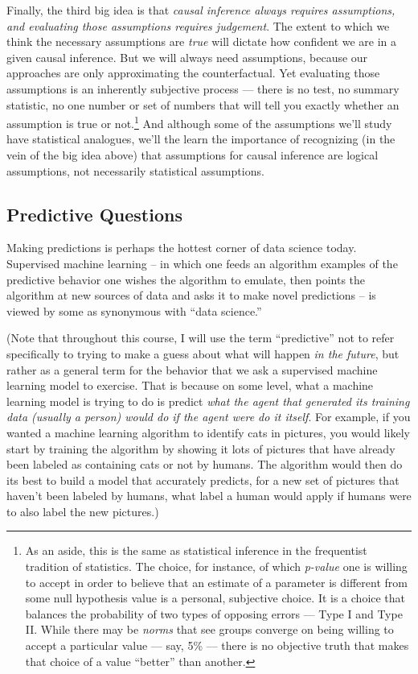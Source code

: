 \documentclass[12pt]{article}
\begin{document}
Finally, the third big idea is that \emph{causal inference always requires assumptions, and evaluating those assumptions requires judgement}.  The extent to which we think the necessary assumptions are \emph{true} will dictate how confident we are in a given causal inference.  But we will always need assumptions, because our approaches are only approximating the counterfactual.  Yet evaluating those assumptions is an inherently subjective process --- there is no test, no summary statistic, no one number or set of numbers that will tell you exactly whether an assumption is true or not.\footnote{\rmfamily As an aside, this is the same as statistical inference in the frequentist tradition of statistics.  The choice, for instance, of which \emph{p-value} one is willing to accept in order to believe that an estimate of a parameter is different from some null hypothesis value is a personal, subjective choice.  It is a choice that balances the probability of two types of opposing errors --- Type I and Type II.  While there may be \emph{norms} that see groups converge on being willing to accept a particular value --- say, 5\% --- there is no objective truth that makes that choice of a value ``better'' than another.}  And although some of the assumptions we'll study have statistical analogues, we'll the learn the importance of recognizing (in the vein of the big idea above) that assumptions for causal inference are logical assumptions, not necessarily statistical assumptions.



\subsection{Predictive Questions}

Making predictions is perhaps the hottest corner of data science today. Supervised machine learning -- in which one feeds an algorithm examples of the predictive behavior one wishes the algorithm to emulate, then points the algorithm at new sources of data and asks it to make novel predictions -- is viewed by some as synonymous with ``data science.''

(Note that throughout this course, I will use the term ``predictive'' not to refer specifically to trying to make a guess about what will happen \emph{in the future}, but rather as a general term for the behavior that we ask a supervised machine learning model to exercise. That is because on some level, what a machine learning model is trying to do is predict \emph{what the agent that generated its training data (usually a person) would do if the agent were do it itself}. For example, if you wanted a machine learning algorithm to identify cats in pictures, you would likely start by training the algorithm by showing it lots of pictures that have already been labeled as containing cats or not by humans. The algorithm would then do its best to build a model that accurately predicts, for a new set of pictures that haven't been labeled by humans, what label a human  would apply if humans were to also label the new pictures.)
\end{document}
